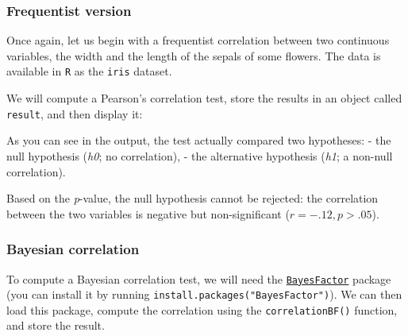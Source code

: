 \documentclass[10pt,a4paper,onecolumn]{article}
\newenvironment{Shaded}{\begin{snugshade}}{\end{snugshade}}
\newcommand{\CommentTok}[1]{\textcolor[rgb]{0.56,0.35,0.01}{\textit{#1}}}
\newcommand{\FunctionTok}[1]{\textcolor[rgb]{0.00,0.00,0.00}{#1}}
\newcommand{\NormalTok}[1]{#1}
\newcommand{\OtherTok}[1]{\textcolor[rgb]{0.56,0.35,0.01}{#1}}
\newcommand{\SpecialCharTok}[1]{\textcolor[rgb]{0.00,0.00,0.00}{#1}}
\begin{document}
\hypertarget{frequentist-version}{%
\subsubsection{Frequentist version}\label{frequentist-version}}

Once again, let us begin with a frequentist correlation between two
continuous variables, the width and the length of the sepals of some
flowers. The data is available in \texttt{R} as the \texttt{iris}
dataset.

We will compute a Pearson's correlation test, store the results in an
object called \texttt{result}, and then display it:

\begin{Shaded}
\end{Shaded}

As you can see in the output, the test actually compared two hypotheses:
- the null hypothesis (\emph{h0}; no correlation), - the alternative
hypothesis (\emph{h1}; a non-null correlation).

Based on the \emph{p}-value, the null hypothesis cannot be rejected: the
correlation between the two variables is negative but non-significant
(\(r = -.12, p > .05\)).

\hypertarget{bayesian-correlation}{%
\subsubsection{Bayesian correlation}\label{bayesian-correlation}}

To compute a Bayesian correlation test, we will need the
\href{https://richarddmorey.github.io/BayesFactor/}{\texttt{BayesFactor}}
package (you can install it by running
\texttt{install.packages("BayesFactor")}). We can then load this
package, compute the correlation using the \texttt{correlationBF()}
function, and store the result.
\end{document}
